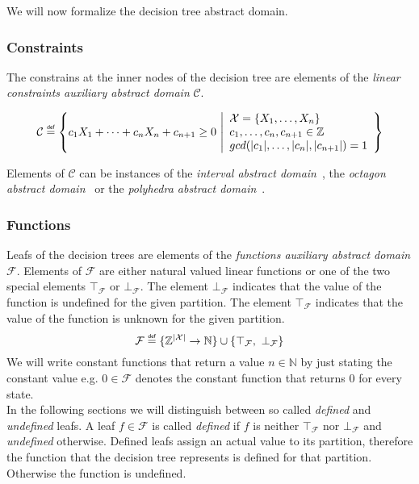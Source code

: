 \documentclass[11pt,a4paper,titlepage]{article}
\theoremstyle{definition}
\newcommand\eqdef{\mathrel{\overset{\makebox[0pt]{\mbox{\normalfont\tiny\sffamily def}}}{=}}}
\begin{document}
We will now formalize the decision tree abstract domain.

\subsubsection*{Constraints}

The constrains at the inner nodes of the decision tree are elements of the 
\textit{linear constraints auxiliary abstract domain} $\mathcal{C}$.  

\[
    \mathcal{C} \eqdef 
    \left
        \{ 
        c_1 X_1 + \dots + c_n X_n + c_{n+1} \geq 0 \
        \middle\vert 
        \begin{array}{l}
            \mathcal{X} = \{X_1, \dots, X_n\}\\
            c_1, \dots, c_n, c_{n+1} \in \mathbb{Z} \\
            gcd(|c_1|, \dots, |c_n|, |c_{n+1}|) = 1
        \end{array}
    \right
    \}
\]

Elements of $\mathcal{C}$ can be instances of the \textit{interval abstract domain}~\cite{CousotCousot76-1}, 
the \textit{octagon abstract domain}~\cite{Mine:2006:OAD:1145489.1145526} or the \textit{polyhedra abstract domain}~\cite{Cousot:1978:ADL:512760.512770}.

\subsubsection*{Functions}

Leafs of the decision trees are elements of the \textit{functions auxiliary abstract domain} $\mathcal{F}$.
Elements of $\mathcal{F}$ are either natural valued linear functions or one of the two special elements $\top_{\mathcal{F}}$ or $\bot_{\mathcal{F}}$.
The element $\bot_{\mathcal{F}}$ indicates that the value of the function is undefined for the given partition. 
The element $\top_{\mathcal{F}}$ indicates that the value of the function is unknown for the given partition.
\[
    \mathcal{F} \eqdef \{ \mathbb{Z}^{|\mathcal{X}|} \rightarrow \mathbb{N} \} \cup \{ \top_{\mathcal{F}}, \ \bot_{\mathcal{F}} \}
\]
We will write constant functions that return a value $n \in \mathbb{N}$ by just stating the constant value e.g. $0 \in \mathcal{F}$ 
denotes the constant function that returns $0$ for every state.\\

In the following sections we will distinguish between so called \textit{defined} and \textit{undefined} leafs. 
A leaf $f \in \mathcal{F}$ is called \textit{defined} if $f$ is neither $\top_{\mathcal{F}}$ nor $\bot_{\mathcal{F}}$  and \textit{undefined} otherwise.
Defined leafs assign an actual value to its partition, therefore the function that the decision tree represents is defined for that partition. Otherwise 
the function is undefined.
\end{document}

